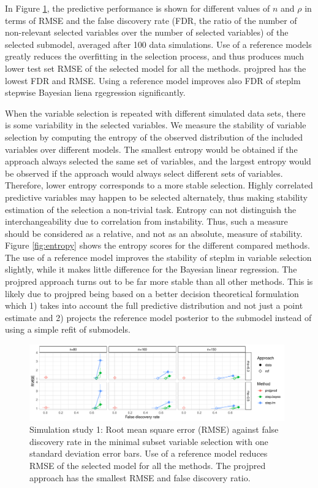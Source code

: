 \documentclass[a4]{article}
\theoremstyle{definition}
\begin{document}
In Figure \ref{fig:rmse_vs_fdr}, the predictive performance is shown
for different values of $n$ and $\rho$ in terms of RMSE and the false discovery rate (FDR, the ratio of the number of non-relevant selected
variables over the number of selected variables) of the selected submodel,
averaged after 100 data simulations. Use of a reference models greatly reduces the overfitting in the selection process, and thus produces much lower test set RMSE of the selected model for all the methods. projpred has the lowest FDR and RMSE. Using a reference model improves also FDR of steplm stepwise Bayesian liena rgegression significantly. 

When the variable selection is repeated with different simulated data
sets, there is some variability in the selected variables. We
measure the stability of variable selection by computing the entropy
of the observed distribution of the included variables over different models. The smallest entropy
would be obtained if the approach always selected the same set of
variables, and the largest entropy would be observed if the approach
would always select different sets of variables. Therefore, lower entropy 
corresponds to a more stable selection. Highly correlated predictive variables may happen to be
selected alternately, thus making stability estimation of the
selection a non-trivial task. Entropy can not distinguish the interchangeability 
due to correlation from instability. Thus, such a measure should be 
considered as a relative, and not as an absolute, measure of stability.
Figure \ref{fig:entropy} shows the entropy scores for the different compared
methods. The use of a reference model
improves the stability of steplm in variable selection slightly, while it makes
little difference for the Bayesian linear regression. The
projpred approach turns out to be far more stable than all
other methods. This is likely due to projpred being based on a better
decision theoretical formulation which 1) takes into account the full
predictive distribution and not just a point estimate and 2) projects
the reference model posterior to the submodel instead of using a
simple refit of submodels.

\begin{figure}[tp]
  \centering
  \includegraphics[width=0.98\textwidth]{graphics/rmse_vs_fdr_parallel.pdf}
  \vspace{-0.3\baselineskip}
  \caption{Simulation study 1: Root mean square error (RMSE) against false discovery rate in the minimal subset variable selection with one standard deviation error bars. Use of a reference model reduces RMSE of the selected model for all the methods. The projpred approach has the smallest RMSE and false discovery ratio.}
  \label{fig:rmse_vs_fdr}
\end{figure}
\end{document}
